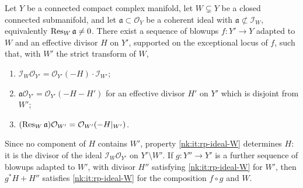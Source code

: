 \begin{lemma}\label{nk:lem:relative-principalization}
Let $Y$ be a connected compact complex manifold, let $W\subsetneq Y$ be a
closed connected submanifold, and let $\mathfrak a\subset\mathcal O_Y$ be a coherent ideal
with $\mathfrak a\not\subset\mathcal I_W$, equivalently
$\operatorname{Res}_{W}\mathfrak a\ne0$. There exist a sequence of blowups $f\colon Y'\to Y$
adapted to $W$ and an effective divisor $H$ on $Y'$, supported on the
exceptional locus of $f$, such that, with $W'$ the strict transform of
$W$,
\begin{enumerate}[label=\textup{(\roman*)},leftmargin=*,itemsep=.2em,topsep=.3em]
\item\label{nk:it:rp-ideal-W} $\mathcal I_W\mathcal O_{Y'}=\mathcal O_{Y'}(-H)\cdot\mathcal I_{W'}$;
\item\label{nk:it:rp-principal}
  $\mathfrak a\mathcal O_{Y'}=\mathcal O_{Y'}(-H-H')$ for an effective divisor
  $H'$ on $Y'$ which is disjoint from $W'$;
\item\label{nk:it:rp-restriction}
  $(\operatorname{Res}_{W}\mathfrak a)\mathcal O_{W'}=\mathcal O_{W'}(-H|_{W'})$.
\end{enumerate}
\end{lemma}

Since no component of $H$ contains $W'$, property \ref{nk:it:rp-ideal-W}
determines $H$: it is the divisor of the ideal $\mathcal I_W\mathcal O_{Y'}$ on
$Y'\setminus W'$. If $g\colon Y''\to Y'$ is a further sequence of
blowups adapted to $W'$, with divisor $H''$ satisfying
\ref{nk:it:rp-ideal-W} for $W'$, then $g^*H+H''$ satisfies
\ref{nk:it:rp-ideal-W} for the composition $f\circ g$ and $W$.

